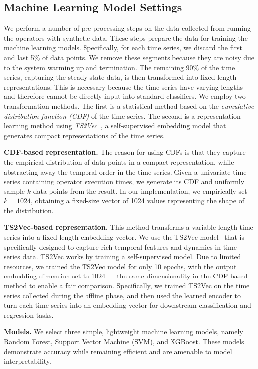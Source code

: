 \subsection{Machine Learning Model Settings}
We perform a number of pre-processing steps on the data collected from running the operators with synthetic data. These steps prepare the data for training the machine learning models. Specifically, for each time series, we discard the first and last 5\% of data points.  We remove these segments because they are noisy due to the system warming up and termination.  The remaining 90\% of the time series, capturing the steady-state data, is then transformed into fixed-length representations. 
%
This is necessary because the time series have varying lengths and therefore cannot be directly input into standard classifiers. We employ two transformation methods. The first is a statistical method based on the \textit{cumulative distribution function (CDF)} of the time series. The second is a representation learning method using \textit{TS2Vec}~\cite{yue2022ts2vec}, a self-supervised embedding model that generates compact representations of the time series. 


{\bf CDF-based representation.} The reason for using CDFs is that they capture the empirical distribution of data points in a compact representation,  while abstracting away the temporal order in the time series. Given a univariate time series containing operator execution times, we generate its CDF and uniformly sample $k$ data points from the result. In our implementation, we empirically set $k=1024$, obtaining a fixed-size vector of 1024 values representing the shape of the distribution.

{\bf TS2Vec-based representation.} This method transforms a variable-length time series into a fixed-length embedding vector. We use the TS2Vec model~\cite{yue2022ts2vec} that is specifically designed to capture rich temporal features and dynamics in time series data. TS2Vec works by training a self-supervised model. Due to limited resources, we trained the TS2Vec model for only 10 epochs, with the output embedding dimension set to 1024 --- the same dimensionality in the CDF-based method to enable a fair comparison. Specifically, we trained TS2Vec on the time series collected during the offline phase, and then used the learned encoder to turn each time series into an embedding vector for downstream classification and regression tasks.

{\bf Models.} We select three simple, lightweight machine learning models, namely Random Forest, Support Vector Machine (SVM), and XGBoost. These models demonstrate accuracy while remaining efficient and are amenable to model interpretability.  
